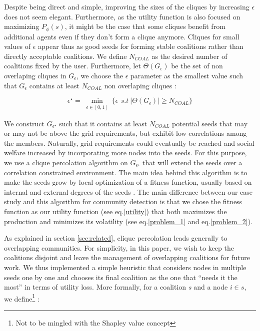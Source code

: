 \documentclass[conference]{IEEEtran}
\begin{document}
Despite being direct and simple, improving the sizes of the cliques by increasing $ \epsilon $ does not seem elegant. Furthermore, as the utility function is also focused on maximizing $ P_{\phi}(s) $, it might be the case that some cliques benefit from additional agents even if they don't form a clique anymore. Cliques for small values of $ \epsilon $ appear thus as good seeds for forming stable coalitions rather than directly acceptable coalitions. We define $ N_{COAL} $ as the desired number of coalitions fixed by the user. Furthermore, let $ \Theta(G_{\epsilon}) $ be the set of non overlaping cliques in $ G_{\epsilon} $, we choose the $ \epsilon $ parameter as the smallest value such that $ G_{\epsilon} $ contains at least $ N_{COAL} $ non overlaping cliques :

\begin{equation}
\epsilon^{\star} = \min_{\substack{ \epsilon \in [0,1] }} \Big\{ \epsilon\,\ s.t\ |\Theta(G_{\epsilon})| \geq N_{COAL} \Big\}
\end{equation}

We construct $ G_{\epsilon^{\star}} $ such that it contains at least $ N_{COAL} $ potential seeds that may or may not be above the grid requirements, but exhibit low correlations among the members. Naturally, grid requirements could eventually be reached and social welfare increased by incorporating more nodes into the seeds. For this purpose, we use a clique percolation algorithm on $ G_{\epsilon^{\star}} $ that will extend the seeds over a correlation constrained environment. The main idea behind this algorithm is to make the seeds grow by local optimization of a fitness function, usually based on internal and external degrees of the seeds \cite{Lancichinetti}. The main difference between our case study and this algorithm for community detection is that we chose the fitness function as our utility function (see eq.\eqref{utility}) that both maximizes the production and minimizes its volatility (see eq.\ref{problem_1} and eq.\ref{problem_2}). 

As explained in section \ref{sec:related}, clique percolation leads generally to overlapping communities. For simplicity, in this paper, we wish to keep the coalitions disjoint and  leave the management of overlapping coalitions for future work. We thus implemented a simple heuristic that considers nodes in multiple seeds one by one and chooses its final coalition as the one that “needs it the most” in terms of utility loss. More formally, for a coalition \textit{s} and a node $ i \in s $, we define\footnote{\label{note1}Not to be mingled with the Shapley value concept} :
\end{document}
